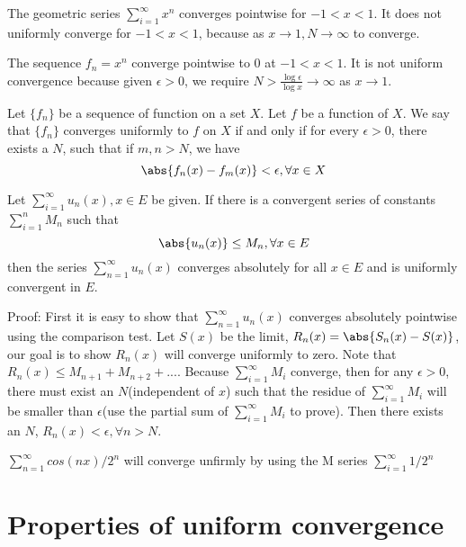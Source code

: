 \begin{refsection}
\begin{example}
	The geometric series $\sum_{i=1}^\infty x^n$ converges pointwise for $-1 < x < 1$. It does not uniformly converge for $-1 < x < 1$, because as $x\to 1,N\to \infty$ to converge.
\end{example}

\begin{example}
	The sequence $f_n = x^n$ converge pointwise to 0 at $-1<x<1$. It is not uniform convergence because given $\epsilon > 0$, we require $N > \frac{\log \epsilon}{\log x} \to \infty$ as $x \to 1$.
\end{example}

\begin{definition}
	Let $\{f_n\}$ be a sequence of function on a set $X$. Let $f$ be a function of $X$. We say that $\{f_n\}$ converges uniformly to $f$ on $X$ if and only if for every $\epsilon > 0$, there exists a $N$, such that if $m,n > N$, we have\cite{johnsonbaugh2010foundations}
	$$\abs{f_n(x)-f_m(x)} < \epsilon, \forall x\in X$$
\end{definition}

\begin{theorem}
	\cite[416]{kaplan1973advanced} Let $\sum_{i=1}^\infty u_n(x),x\in E$ be given. If there is a convergent series of constants $\sum_{i=1}^n M_n$ such that
	$$\abs{u_n(x)} \leq M_n, \forall x\in E$$
	then the series $\sum_{n=1}^\infty u_n(x)$ converges absolutely for all $x \in E$ and is uniformly convergent in $E$.
\end{theorem}

Proof: First it is easy to show that $\sum_{n=1}^\infty u_n(x)$ converges absolutely pointwise using the comparison test. Let $S(x)$ be the limit, $R_n(x) = \abs{S_n(x)-S(x)}$, our goal is to show $R_n(x)$ will converge uniformly to zero. Note that $R_n(x) \leq M_{n+1} + M_{n+2} + ...$. Because $\sum_{i=1}^\infty M_i$ converge, then for any $\epsilon > 0$, there must exist an $N$(independent of $x$) such that the residue of $\sum_{i=1}^\infty M_i$ will be smaller than $\epsilon$(use the partial sum of $\sum_{i=1}^\infty M_i$ to prove). Then there exists an $N$, $R_n(x) < \epsilon, \forall n > N$.



\begin{example}
	$\sum_{n=1}^\infty cos(nx)/2^n$ will converge unfirmly by using the M series $\sum_{i=1}^\infty 1/2^n$
\end{example}

\section{Properties of uniform convergence}

\end{refsection}
